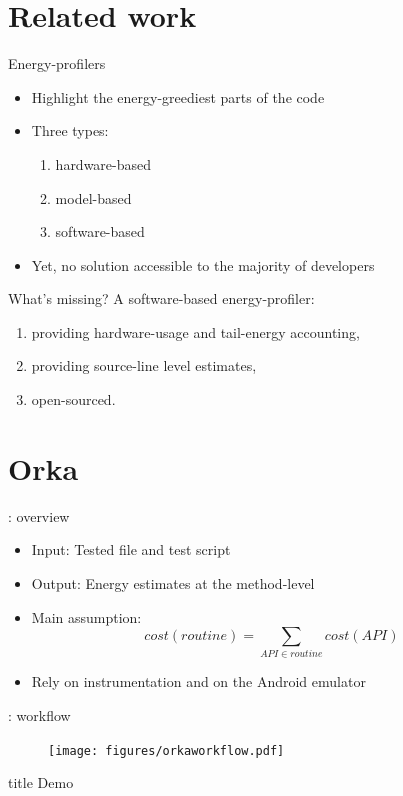 \section{Related work}
\begin{frame}{Energy-profilers}
\begin{itemize}
\item Highlight the energy-greediest parts of the code
\item Three types:
\begin{enumerate}
\item hardware-based
\item model-based
\item software-based
\end{enumerate}
\item Yet, \alert{no solution accessible} to the majority of developers
\end{itemize}
\end{frame}
%
%
\begin{frame}{What's missing?}
A software-based energy-profiler:
\begin{enumerate}
\item providing hardware-usage and \alert{tail-energy} accounting,
\item providing \alert{source-line level} estimates,
\item open-sourced.
\end{enumerate}
\end{frame}
%
%
\section{Orka}
\begin{frame}{\orka{}: overview}
\begin{itemize}
\item Input: Tested \apk{} file and \monkeyrunner{} test script
\item Output: Energy estimates at the method-level
\item Main assumption:
$$ cost(routine) = \sum_{API \in routine} cost(API)$$
\item Rely on \alert{instrumentation} and on the Android emulator
\end{itemize}
\end{frame}
%
%
\begin{frame}{\orka{}: workflow}
\begin{figure}
        \texttt{[image: figures/orkaworkflow.pdf]}
\end{figure}
\end{frame}
%
%
\begin{frame}
  \vfill
  \centering
  \begin{beamercolorbox}[sep=8pt,center,shadow=true,rounded=true]{title}
    Demo\par%
  \end{beamercolorbox}
  \vfill
\end{frame}
%
